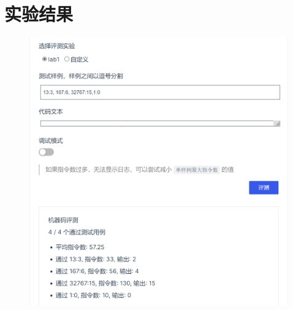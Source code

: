 \documentclass[UTF8]{ctexart}
\begin{document}
\clearpage
\section{实验结果}
\begin{figure}[htbp]
    \centering
    \includegraphics[scale=0.8]{result.png}
\end{figure}
\end{document}
